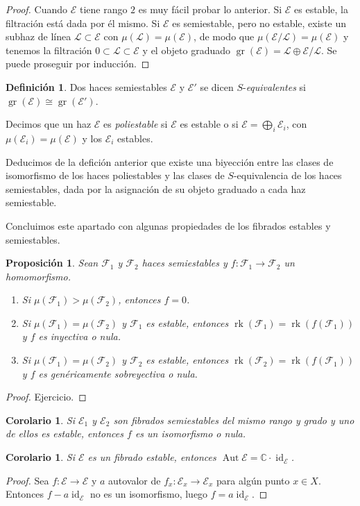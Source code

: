 \documentclass[12pt, a4paper]{amsart}
\newcommand\CC{\mathbb{C}}
\newcommand\FF{\mathscr{F}}
\newcommand\EE{\mathscr{E}}
\newcommand\LL{\mathscr{L}}
\DeclareMathOperator\id{id}
\DeclareMathOperator\gr{gr}
\DeclareMathOperator\rk{rk}
\DeclareMathOperator\Aut{Aut}
\newtheorem{prop}[thm]{Proposición}
\newtheorem{corol}[thm]{Corolario}
\theoremstyle{remark} \newtheorem{rmk}[thm]{Observación}
\theoremstyle{remark} \newtheorem{rmks}[thm]{Observaciones}
\theoremstyle{definition} \newtheorem{defn}[thm]{Definición}
\theoremstyle{definition} \newtheorem{ejs}[thm]{Ejemplos}
\theoremstyle{definition} \newtheorem{ej}[thm]{Ejemplo}
\begin{document}
\begin{proof}
	Cuando $\EE$ tiene rango $2$ es muy fácil probar lo anterior. Si $\EE$ es estable, la filtración está dada por él mismo. Si $\EE$ es semiestable, pero no estable, existe un subhaz de línea  $\LL\subset \EE$ con  $\mu(\LL)=\mu(\EE)$, de modo que $\mu(\EE/\LL)=\mu(\EE)$ y tenemos la filtración $0\subset \LL \subset \EE$ y el objeto graduado  $\gr(\EE)=\LL \oplus \EE/\LL$. Se puede proseguir por inducción.
\end{proof}

\begin{defn}
	Dos haces semiestables $\EE$ y  $\EE'$ se dicen $S$-\emph{equivalentes} si $\gr(\EE)\cong \gr(\EE')$.

	Decimos que un haz $\EE$ es \emph{poliestable} si $\EE$ es estable o si $\EE=\bigoplus_i \EE_i$, con $\mu(\EE_i)=\mu(\EE)$ y los $\EE_i$ estables.
\end{defn}

Deducimos de la defición anterior que existe una biyección entre las clases de isomorfismo de los haces poliestables y las clases de $S$-equivalencia de los haces semiestables, dada por la asignación de su objeto graduado a cada haz semiestable.

Concluimos este apartado con algunas propiedades de los fibrados estables y semiestables.

\begin{prop}
	Sean $\FF_1$ y $\FF_2$ haces semiestables y $f:\FF_1\rightarrow \FF_2$ un homomorfismo.
	\begin{enumerate}
		\item Si $\mu(\FF_1)>\mu(\FF_2)$, entonces $f=0$.
		\item Si $\mu(\FF_1)=\mu(\FF_2)$ y $\FF_1$ es estable, entonces $\rk(\FF_1)=\rk(f(\FF_1))$ y $f$ es inyectiva o nula.
		\item Si $\mu(\FF_1)=\mu(\FF_2)$ y $\FF_2$ es estable, entonces $\rk(\FF_2)=\rk(f(\FF_1))$ y $f$ es genéricamente sobreyectiva o nula.
	\end{enumerate}
\end{prop}
\begin{proof}
Ejercicio.	
\end{proof}

\begin{corol}
	Si $\EE_1$ y $\EE_2$ son fibrados semiestables del mismo rango y grado y uno de ellos es estable, entonces $f$ es un isomorfismo o nula.
\end{corol}
\begin{corol}
	Si $\EE$ es un fibrado estable, entonces $\Aut \EE=\CC\cdot \id_\EE$.	
\end{corol}
\begin{proof}
Sea $f:\EE\rightarrow \EE$ y $a$ autovalor de $f_x:\EE_x\rightarrow \EE_x$ para algún punto $x\in X$. Entonces $f-a\id_\EE$ no es un isomorfismo, luego $f=a\id_\EE$.
\end{proof}
\end{document}
